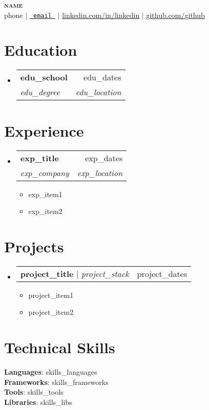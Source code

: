 \documentclass[letterpaper,11pt]{article}
\makeatletter
\newcommand{\resumeItem}[1]{\item\small{#1 \vspace{-2pt}}}
\newcommand{\resumeSubheading}[4]{%
  \vspace{-2pt}\item
  \begin{tabular*}{0.97\textwidth}[t]{l@{\extracolsep{\fill}}r}
    \textbf{#1} & #2 \\
    \textit{\small#3} & \textit{\small #4} \\
  \end{tabular*}\vspace{-7pt}}
\newcommand{\resumeProjectHeading}[2]{%
  \item
  \begin{tabular*}{0.97\textwidth}{l@{\extracolsep{\fill}}r}
    \small#1 & #2 \\
  \end{tabular*}\vspace{-7pt}}
\newcommand{\resumeSubHeadingListStart}{\begin{itemize}[leftmargin=0.15in, label={}]}
\newcommand{\resumeSubHeadingListEnd}{\end{itemize}}
\newcommand{\resumeItemListStart}{\begin{itemize}}
\newcommand{\resumeItemListEnd}{\end{itemize}\vspace{-5pt}}
\makeatother
\begin{document}
\begin{center}
  \textbf{\Huge \scshape {{name}}} \\ \vspace{1pt}
  \small {{phone}} $|$ \href{mailto:{{email}}}{\texttt{ {{email}} }} $|$ 
  \href{https://linkedin.com/in/{{linkedin}}}{\underline{linkedin.com/in/{{linkedin}}}} $|$
  \href{https://github.com/{{github}}}{\underline{github.com/{{github}}}}
\end{center}

\section{Education}
\resumeSubHeadingListStart
  \resumeSubheading
    { {{edu_school}} }{ {{edu_dates}} }
    { {{edu_degree}} }{ {{edu_location}} }
\resumeSubHeadingListEnd

\section{Experience}
\resumeSubHeadingListStart
  \resumeSubheading
    { {{exp_title}} }{ {{exp_dates}} }
    { {{exp_company}} }{ {{exp_location}} }
  \resumeItemListStart
    \resumeItem{ {{exp_item1}} }
    \resumeItem{ {{exp_item2}} }
  \resumeItemListEnd
\resumeSubHeadingListEnd

\section{Projects}
\resumeSubHeadingListStart
  \resumeProjectHeading
    { \textbf{ {{project_title}} } $|$ \emph{ {{project_stack}} } }{ {{project_dates}} }
  \resumeItemListStart
    \resumeItem{ {{project_item1}} }
    \resumeItem{ {{project_item2}} }
  \resumeItemListEnd
\resumeSubHeadingListEnd

\section{Technical Skills}
\begin{itemize}[leftmargin=0.15in, label={}]
\small{\item{
\textbf{Languages}{: {{skills_languages}}} \\
\textbf{Frameworks}{: {{skills_frameworks}}} \\
\textbf{Tools}{: {{skills_tools}}} \\
\textbf{Libraries}{: {{skills_libs}}}
}}
\end{itemize}
\end{document}

